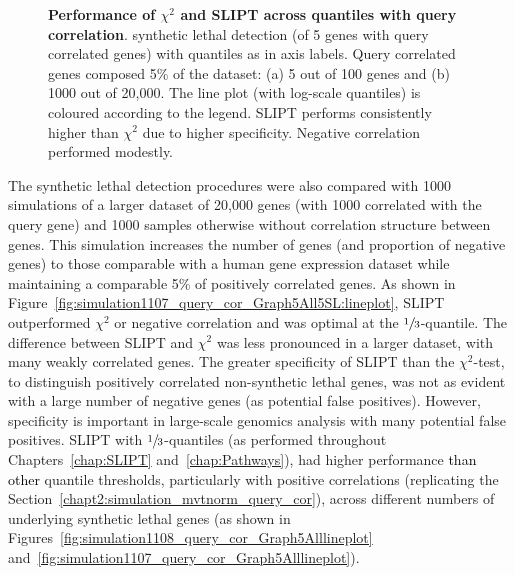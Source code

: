 \begin{figure*}[!tb]
    \caption[Performance of $\chi^2$ and SLIPT across quantiles with query correlation]{\textbf{Performance of $\chi^2$ and SLIPT across quantiles with query correlation}. \Gls{synthetic lethal} detection (of 5 genes  with query correlated genes) with quantiles as in axis labels. Query correlated genes composed 5\% of the dataset: (a) 5 out of 100 genes and (b) 1000 out of 20,000. The line plot (with log-scale quantiles) is coloured according to the legend. \gls{SLIPT} performs consistently higher than $\chi^2$ due to higher specificity. Negative correlation performed modestly.}
    \label{fig:simulation1108_query_cor_Graph5All5SL}
    \end{figure*}
    

The \gls{synthetic lethal} detection procedures were also compared with 1000 simulations of a larger dataset of 20,000 genes (with 1000 correlated with the query gene) and 1000 samples otherwise without correlation structure between genes. This simulation increases the number of genes (and proportion of negative genes) to those comparable with a human \gls{gene expression} dataset while maintaining a comparable 5\% of positively correlated genes. As shown in Figure~\ref{fig:simulation1107_query_cor_Graph5All5SL:lineplot}, \gls{SLIPT} outperformed $\chi^2$ or negative correlation and was optimal at the $\sfrac{1}{3}$-quantile. The difference between \gls{SLIPT} and $\chi^2$ was less pronounced in a larger dataset, with many weakly correlated genes. The greater specificity of \gls{SLIPT} than the $\chi^2$-test, to distinguish positively correlated non-synthetic lethal genes, was not as evident with a large number of negative genes (as potential false positives). However, specificity is important in large-scale \glspl{genomic} analysis with many potential false positives.
%  
\gls{SLIPT} with $\sfrac{1}{3}$-quantiles (as performed throughout Chapters~\ref{chap:SLIPT} and~\ref{chap:Pathways}), had higher performance \textcolor{black}{than other} quantile thresholds, particularly with positive correlations (replicating the Section~\ref{chapt2:simulation_mvtnorm_query_cor}), across different numbers of underlying \gls{synthetic lethal} genes (as shown in Figures~\ref{fig:simulation1108_query_cor_Graph5Alllineplot} and~\ref{fig:simulation1107_query_cor_Graph5Alllineplot}).

